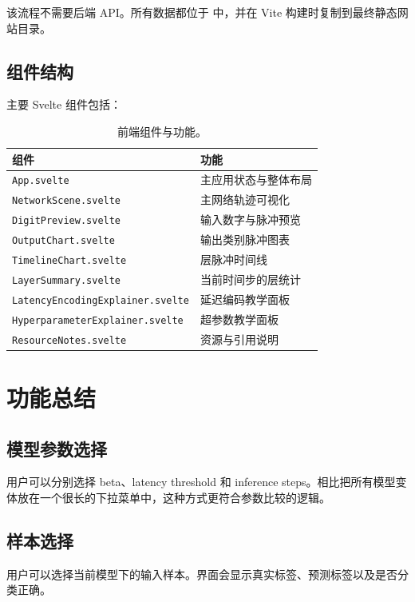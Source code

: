 \documentclass[UTF8,11pt,a4paper]{ctexart}
\begin{document}
该流程不需要后端 API。所有数据都位于  中，并在 Vite 构建时复制到最终静态网站目录。

\subsection{组件结构}

主要 Svelte 组件包括：

\begin{table}[H]
\centering
\caption{前端组件与功能。}
\begin{tabularx}{0.92\textwidth}{ll}
\toprule
组件 & 功能 \\
\midrule
\texttt{App.svelte} & 主应用状态与整体布局 \\
\texttt{NetworkScene.svelte} & 主网络轨迹可视化 \\
\texttt{DigitPreview.svelte} & 输入数字与脉冲预览 \\
\texttt{OutputChart.svelte} & 输出类别脉冲图表 \\
\texttt{TimelineChart.svelte} & 层脉冲时间线 \\
\texttt{LayerSummary.svelte} & 当前时间步的层统计 \\
\texttt{LatencyEncodingExplainer.svelte} & 延迟编码教学面板 \\
\texttt{HyperparameterExplainer.svelte} & 超参数教学面板 \\
\texttt{ResourceNotes.svelte} & 资源与引用说明 \\
\bottomrule
\end{tabularx}
\end{table}

\section{功能总结}

\subsection{模型参数选择}

用户可以分别选择 beta、latency threshold 和 inference steps。相比把所有模型变体放在一个很长的下拉菜单中，这种方式更符合参数比较的逻辑。

\subsection{样本选择}

用户可以选择当前模型下的输入样本。界面会显示真实标签、预测标签以及是否分类正确。
\end{document}
